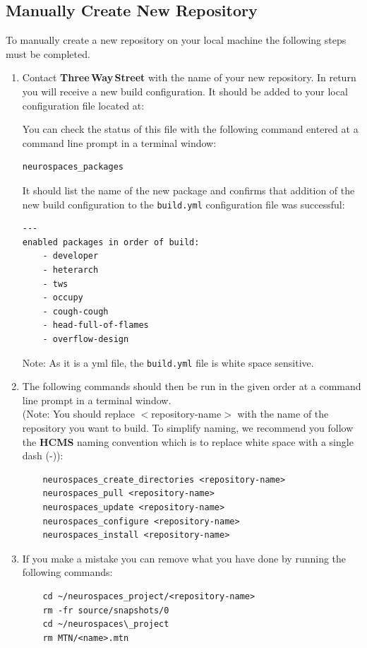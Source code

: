 \documentclass[12pt]{article}
\begin{document}
\subsection*{Manually Create New Repository}

To manually create a new repository on your local machine the following steps must be completed. 

\begin{enumerate}
\item Contact {\bf \small Three\,Way\,Street} with the name of your new repository. In return you will receive a new build configuration. It should be added to your local configuration file located at:\\
  \hspace*{5mm}{\tt /etc/neurospaces/developer/build.yml}
  
You can check the status of this file with the following command entered at a command line prompt in a terminal window:
\begin{verbatim}
neurospaces_packages
\end{verbatim}
It should list the name of the new package and confirms that addition of the new build configuration to the {\tt \small build.yml} configuration file was successful:
\begin{verbatim}
---
enabled packages in order of build:
    - developer
    - heterarch
    - tws
    - occupy
    - cough-cough
    - head-full-of-flames
    - overflow-design
\end{verbatim}
Note: As it is a yml file, the {\tt \small build.yml} file is white space sensitive.

\item The following commands should then be run in the given order at a command line prompt  in a terminal window.\\
(Note: You should replace $<$repository-name$>$ with the name of the repository you want to build. To simplify naming, we recommend you follow the {\bf \small HCMS} naming convention which is to replace white space with a single dash (-)):
\begin{verbatim}
	neurospaces_create_directories <repository-name>
	neurospaces_pull <repository-name>
	neurospaces_update <repository-name>
	neurospaces_configure <repository-name>
	neurospaces_install <repository-name>
\end{verbatim}
\item If you make a mistake you can remove what you have done by running the following commands:
\begin{verbatim}
	cd ~/neurospaces_project/<repository-name>
	rm -fr source/snapshots/0
	cd ~/neurospaces\_project
	rm MTN/<name>.mtn
\end{verbatim}
\end{enumerate}
\end{document}
